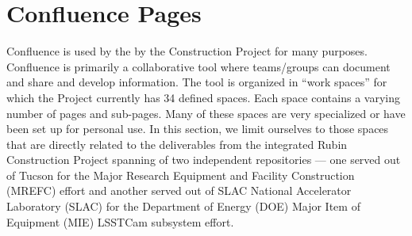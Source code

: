 \section{Confluence Pages}

Confluence is used by the by the Construction Project for many purposes.
Confluence is primarily a collaborative tool where teams/groups can document and share and develop information. \citep{Confluence-cite}
The tool is organized in ``work spaces'' for which the Project currently has 34 defined spaces.
Each space contains a varying number of pages and sub-pages.
Many of these spaces are very specialized or have been set up for personal use.
In this section, we limit ourselves to those spaces that are directly related to the deliverables from the integrated Rubin Construction Project spanning of two independent repositories --- one served out of Tucson for the Major Research Equipment and Facility Construction (MREFC) effort and another served out of SLAC National Accelerator Laboratory (SLAC) for the Department of Energy (DOE) Major Item of Equipment (MIE) LSSTCam subsystem effort.

